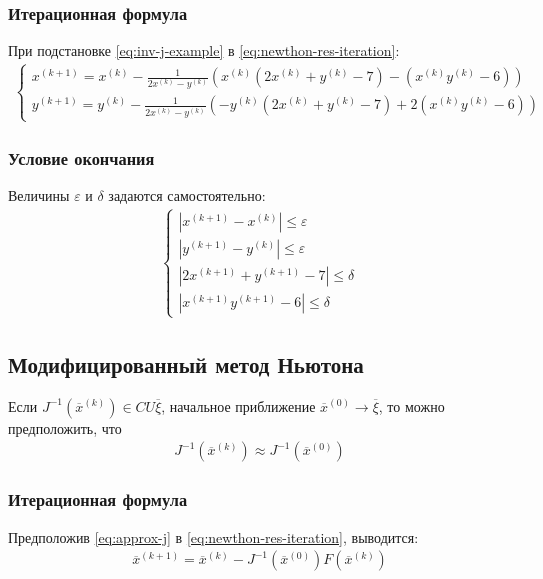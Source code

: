 \subsubsection*{Итерационная формула}
При подстановке \cref{eq:inv-j-example} в \cref{eq:newthon-res-iteration}:
\begin{align}
	\begin{cases}
		x^{(k + 1)} = x^{(k)} - \frac{1}{2 x^{(k)} - y^{(k)}}(x^{(k)}(2x^{(k)}+y^{(k)}-7)-(x^{(k)}y^{(k)} - 6)) \\
		y^{(k+1)} = y^{(k)} - \frac{1}{2 x^{(k)} - y^{(k)}}(-y^{(k)}(2x^{(k)}+y^{(k)}-7)+2(x^{(k)}y^{(k)} - 6))
	\end{cases}
\end{align}
\subsubsection*{Условие окончания}
Величины \(\varepsilon\) и \(\delta\) задаются самостоятельно:
\begin{align}
	\begin{cases}
		|x^{(k+1)} - x^{(k)}| \leq \varepsilon   \\
		|y^{(k+1)} - y^{(k)}| \leq \varepsilon   \\
		|2x^{(k+1)} + y^{(k+1)} - 7| \leq \delta \\
		|x^{(k+1)}y^{(k+1)} - 6| \leq \delta
	\end{cases}
\end{align}

\subsection{Модифицированный метод Ньютона}
Если \(J^{-1}(\overline{x}^{(k)})\in C U\overline{\xi} \), начальное приближение \(\overline{x}^{(0)}\to\overline{\xi}\), то можно предположить, что
\begin{align}\label{eq:approx-j}
	J^{-1}(\overline{x}^{(k)}) \approx J^{-1}(\overline{x}^{(0)})
\end{align}
\subsubsection*{Итерационная формула}
Предположив \cref{eq:approx-j} в \cref{eq:newthon-res-iteration}, выводится:
\begin{align}
	\overline{x}^{(k+1)} = \overline{x}^{(k)}  - J^{-1}(\overline{x}^{(0)})F(\overline{x}^{(k)})
\end{align}


